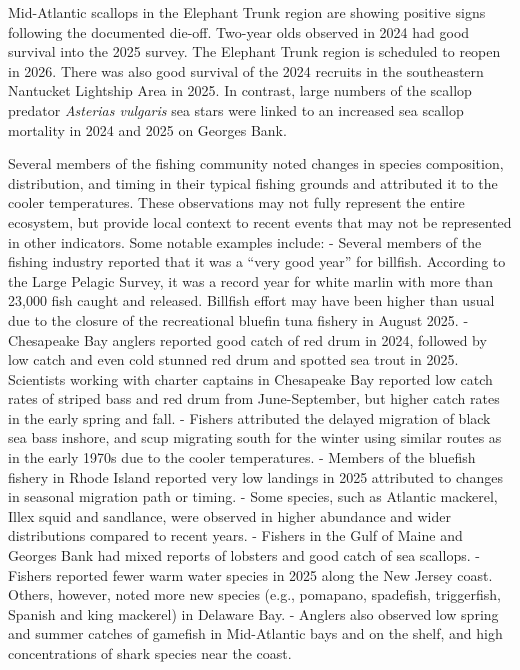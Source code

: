 \documentclass[
  10pt,
]{article}
\begin{document}
Mid-Atlantic scallops in the Elephant Trunk region are showing positive signs following the documented die-off. Two-year olds observed in 2024 had good survival into the 2025 survey. The Elephant Trunk region is scheduled to reopen in 2026. There was also good survival of the 2024 recruits in the southeastern Nantucket Lightship Area in 2025. In contrast, large numbers of the scallop predator \emph{Asterias vulgaris} sea stars were linked to an increased sea scallop mortality in 2024 and 2025 on Georges Bank.

Several members of the fishing community noted changes in species composition, distribution, and timing in their typical fishing grounds and attributed it to the cooler temperatures. These observations may not fully represent the entire ecosystem, but provide local context to recent events that may not be represented in other indicators. Some notable examples include:
- Several members of the fishing industry reported that it was a ``very good year'' for billfish. According to the Large Pelagic Survey, it was a record year for white marlin with more than 23,000 fish caught and released. Billfish effort may have been higher than usual due to the closure of the recreational bluefin tuna fishery in August 2025.
- Chesapeake Bay anglers reported good catch of red drum in 2024, followed by low catch and even cold stunned red drum and spotted sea trout in 2025. Scientists working with charter captains in Chesapeake Bay reported low catch rates of striped bass and red drum from June-September, but higher catch rates in the early spring and fall.
- Fishers attributed the delayed migration of black sea bass inshore, and scup migrating south for the winter using similar routes as in the early 1970s due to the cooler temperatures.
- Members of the bluefish fishery in Rhode Island reported very low landings in 2025 attributed to changes in seasonal migration path or timing.
- Some species, such as Atlantic mackerel, Illex squid and sandlance, were observed in higher abundance and wider distributions compared to recent years.
- Fishers in the Gulf of Maine and Georges Bank had mixed reports of lobsters and good catch of sea scallops.
- Fishers reported fewer warm water species in 2025 along the New Jersey coast. Others, however, noted more new species (e.g., pomapano, spadefish, triggerfish, Spanish and king mackerel) in Delaware Bay.
- Anglers also observed low spring and summer catches of gamefish in Mid-Atlantic bays and on the shelf, and high concentrations of shark species near the coast.
\end{document}
